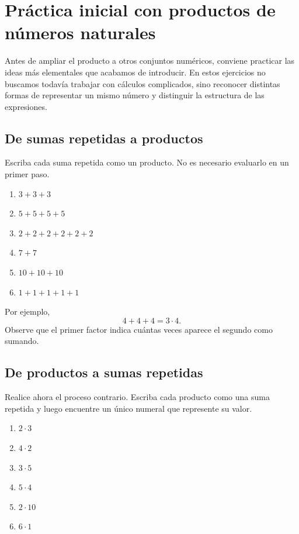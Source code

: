 \section[Práctica inicial con productos]{Práctica inicial con productos de números naturales}

Antes de ampliar el producto a otros conjuntos numéricos, conviene practicar las ideas más elementales que acabamos de introducir. En estos ejercicios no buscamos todavía trabajar con cálculos complicados, sino reconocer distintas formas de representar un mismo número y distinguir la estructura de las expresiones.

\subsection*{De sumas repetidas a productos}

Escriba cada suma repetida como un producto. No es necesario evaluarlo en un primer paso.

\begin{enumerate}
\item \(3+3+3\)
\item \(5+5+5+5\)
\item \(2+2+2+2+2+2\)
\item \(7+7\)
\item \(10+10+10\)
\item \(1+1+1+1+1\)
\end{enumerate}

Por ejemplo,
\[
4+4+4=3\cdot4.
\]
Observe que el primer factor indica cuántas veces aparece el segundo como sumando.

\subsection*{De productos a sumas repetidas}

Realice ahora el proceso contrario. Escriba cada producto como una suma repetida y luego encuentre un único numeral que represente su valor.

\begin{enumerate}
\item \(2\cdot3\)
\item \(4\cdot2\)
\item \(3\cdot5\)
\item \(5\cdot4\)
\item \(2\cdot10\)
\item \(6\cdot1\)
\end{enumerate}

